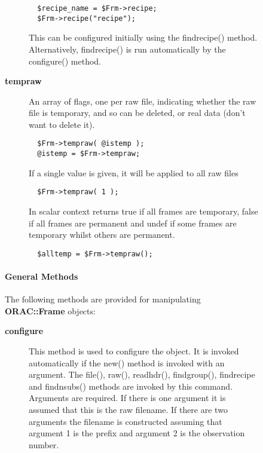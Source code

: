 \begin{description}
\begin{description}
\begin{description}
\begin{verbatim}
  $recipe_name = $Frm->recipe;
  $Frm->recipe("recipe");
\end{verbatim}


This can be configured initially using the findrecipe() method.
Alternatively, findrecipe() is run automatically by the configure()
method.


\item[{\textbf{tempraw}}] \mbox{}

An array of flags, one per raw file, indicating whether the raw
file is temporary, and so can be deleted, or real data (don't want
to delete it).

\begin{verbatim}
  $Frm->tempraw( @istemp );
  @istemp = $Frm->tempraw;
\end{verbatim}


If a single value is given, it will be applied to all raw files

\begin{verbatim}
  $Frm->tempraw( 1 );
\end{verbatim}


In scalar context returns true if all frames are temporary,
false if all frames are permanent and undef if some frames are temporary
whilst others are permanent.

\begin{verbatim}
  $alltemp = $Frm->tempraw();
\end{verbatim}
\end{description}
\paragraph*{General Methods\label{ORAC::Frame_General_Methods}}


The following methods are provided for manipulating
\textbf{ORAC::Frame} objects:

\begin{description}

\item[{\textbf{configure}}] \mbox{}

This method is used to configure the object. It is invoked
automatically if the new() method is invoked with an argument. The
file(), raw(), readhdr(), findgroup(), findrecipe and findnsubs()
methods are invoked by this command. Arguments are required.  If there
is one argument it is assumed that this is the raw filename. If there
are two arguments the filename is constructed assuming that argument 1
is the prefix and argument 2 is the observation number.


\end{description}
\end{description}
\end{description}
